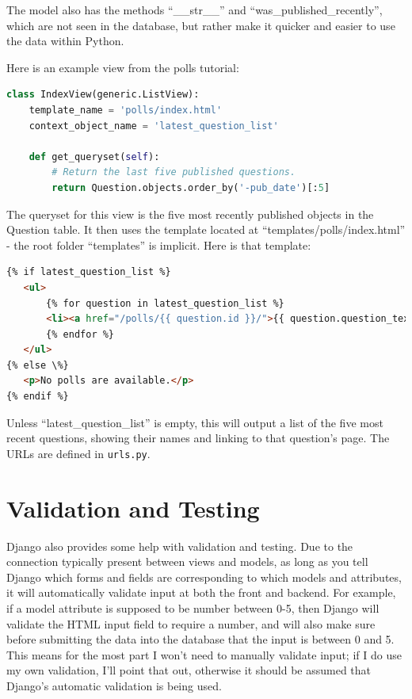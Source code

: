 \documentclass{article}
\begin{document}
The model also has the methods ``\_\_str\_\_'' and ``was\_published\_recently'',
which are not seen in the database,
but rather make it quicker and easier to use the data within Python.

Here is an example view from the polls tutorial:
\begin{lstlisting}[language=Python]
class IndexView(generic.ListView):
    template_name = 'polls/index.html'
    context_object_name = 'latest_question_list'

    def get_queryset(self):
        # Return the last five published questions.
        return Question.objects.order_by('-pub_date')[:5]
\end{lstlisting}

The queryset for this view is the five most recently published objects in the Question table.
It then uses the template located at ``templates/polls/index.html'' -
the root folder ``templates'' is implicit.
Here is that template:
\begin{lstlisting}[language=HTML]
{% if latest_question_list %}
   <ul>
       {% for question in latest_question_list %}
       <li><a href="/polls/{{ question.id }}/">{{ question.question_text }}</a></li>
       {% endfor %}
   </ul>
{% else \%}
   <p>No polls are available.</p>
{% endif %}
\end{lstlisting}

Unless ``latest\_question\_list'' is empty,
this will output a list of the five most recent questions,
showing their names and linking to that question's page.
The URLs are defined in \texttt{urls.py}.

\section{Validation and Testing}
Django also provides some help with validation and testing.
Due to the connection typically present between views and models,
as long as you tell Django which forms and fields are corresponding to which models and attributes,
it will automatically validate input at both the front and backend.
For example, if a model attribute is supposed to be number between 0-5,
then Django will validate the HTML input field to require a number,
and will also make sure before submitting the data into the database that the input is between 0 and 5.
This means for the most part I won't need to manually validate input;
if I do use my own validation, I'll point that out,
otherwise it should be assumed that Django's automatic validation is being used.
\end{document}
